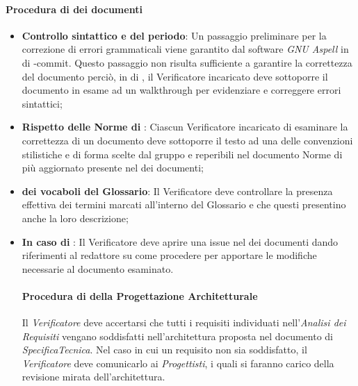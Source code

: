 \paragraph*{Procedura di  dei documenti}
\begin{itemize}
\item \textbf{Controllo sintattico e del periodo}: Un passaggio preliminare per la correzione di errori grammaticali viene garantito dal software \textit{GNU Aspell} in  di -commit. Questo passaggio non risulta sufficiente a garantire la correttezza del documento perciò, in  di , il Verificatore incaricato deve sottoporre il documento in esame ad un walkthrough per evidenziare e correggere errori sintattici;
  \item \textbf{Rispetto delle Norme di }: Ciascun Verificatore incaricato di esaminare la correttezza di un documento deve sottoporre il testo ad una  delle convenzioni stilistiche e di forma scelte dal gruppo e reperibili nel documento Norme di  pi\`u aggiornato presente nel  dei documenti;
  \item \textbf{ dei vocaboli del Glossario}: Il Verificatore deve controllare la presenza effettiva dei termini marcati all'interno del Glossario e che questi presentino anche la loro descrizione;
  \item \textbf{In caso di }: Il Verificatore deve aprire una issue nel  dei documenti dando riferimenti al redattore su come procedere per apportare le modifiche necessarie al documento esaminato.

\paragraph*{Procedura di  della Progettazione Architetturale}
Il \textit{Verificatore} deve accertarsi che tutti i requisiti individuati nell'\textit{Analisi dei Requisiti} vengano soddisfatti
nell'architettura proposta nel documento di \textit{SpecificaTecnica}.
Nel caso in cui un requisito non sia soddisfatto, il \textit{Verificatore} deve comunicarlo ai \textit{Progettisti}, i quali
si faranno carico della revisione mirata dell'architettura. 

\end{itemize}

